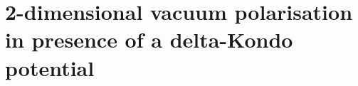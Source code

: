 \chapter{2-dimensional vacuum polarisation in presence of a delta-Kondo potential}\label{chap-vacuum}






